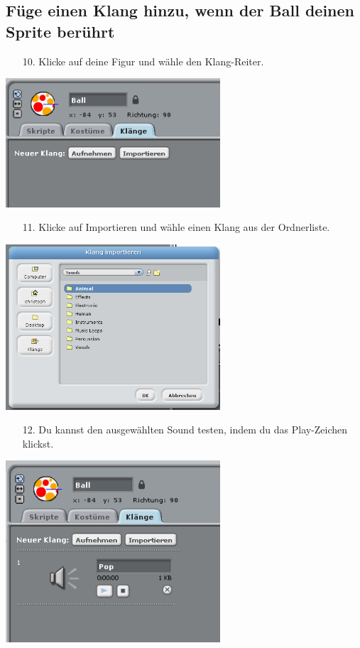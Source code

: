 \subsection{Füge einen Klang hinzu, wenn der Ball deinen Sprite berührt}
\begin{itemize}
\item[10.] Klicke auf deine Figur und wähle den Klang-Reiter.
\end{itemize}
\includegraphics[width=0.6\textwidth]{images/aufgabe3_ton1.png}
\begin{itemize}
\item[11.] Klicke auf Importieren und wähle einen Klang aus der Ordnerliste.
\end{itemize}
\includegraphics[width=0.6\textwidth]{images/aufgabe3_ton2.png} 
\begin{itemize}
\item[12.] Du kannst den ausgewählten Sound testen, indem du das Play-Zeichen klickst.
\end{itemize}
\includegraphics[width=0.6\textwidth]{images/aufgabe3_ton3.png}
